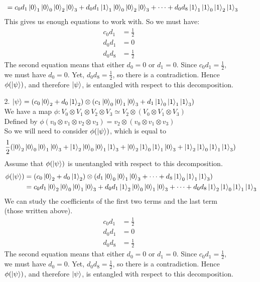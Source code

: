 \documentclass[11pt]{article}
\def\haf{\frac{1}{2}}
\begin{document}
\begin{itemize}
\begin{enumerate}
\begin{align*}
                &= c_0d_1\ket{0}_1\ket{0}_0\ket{0}_2\ket{0}_3 + d_0d_1\ket{1}_1\ket{0}_0\ket{0}_2\ket{0}_3 + \cdots + d_0d_8\ket{1}_1\ket{1}_0\ket{1}_2\ket{1}_3
            \end{align*}
            This gives us enough equations to work with. 
            So we must have: 
            \begin{align*}
                c_0d_1 &= \haf \\
                d_0d_1 &= 0 \\
                d_0d_8 &= \haf
            \end{align*}
            The second equation means that either $d_0 = 0$ or $d_1 = 0$. Since $c_0d_1 = \haf$, we must have $d_0 = 0$.
            Yet, $d_0d_8 = \haf$, so there is a contradiction. 
            Hence $\phi(\ket{\psi})$, and therefore $\ket{\psi}$, is entangled with respect to this decomposition.
            \newpage
        \item[2.]
        $\ket{\psi} = (c_0\ket{0}_2 + d_0\ket{1}_2) 
        \otimes (c_1\ket{0}_0\ket{0}_1\ket{0}_3 + d_1\ket{1}_0\ket{1}_1\ket{1}_3)$ \\
        We have a map $\phi : V_0 \otimes V_1 \otimes V_2 \otimes V_3 \simeq V_2 \otimes (V_0 \otimes V_1 \otimes V_3)$ \\
            Defined by $\phi(v_0 \otimes v_1 \otimes v_2 \otimes v_3) = v_2 \otimes (v_0 \otimes v_1 \otimes v_3) $ \\
            So we will need to consider $\phi(\ket{\psi})$, which is equal to 
            $$\haf(\ket{0}_2\ket{0}_0\ket{0}_1\ket{0}_3 + \ket{1}_2\ket{0}_0\ket{0}_1\ket{1}_3 + \ket{0}_2\ket{1}_0\ket{1}_1\ket{0}_3 + \ket{1}_2 \ket{1}_0\ket{1}_1\ket{1}_3)$$
            Assume that $\phi(\ket{\psi})$ is unentangled with respect to this decomposition.
            \begin{align*}
                \phi(\ket{\psi})
                &= (c_0\ket{0}_2 + d_0\ket{1}_2) \otimes (d_1\ket{0}_0\ket{0}_1\ket{0}_3 + \cdots + d_8\ket{1}_0\ket{1}_1\ket{1}_3) \\
                &= c_0d_1\ket{0}_2\ket{0}_0\ket{0}_1\ket{0}_3 + d_0d_1\ket{1}_2\ket{0}_0\ket{0}_1\ket{0}_3 + \cdots + d_0d_8\ket{1}_2\ket{1}_0\ket{1}_1\ket{1}_3
            \end{align*}
            We can study the coefficients of the first two terms and the last term (those written above).
            \begin{align*}
                c_0d_1 &= \haf \\
                d_0d_1 &= 0 \\
                d_0d_8 &= \haf
            \end{align*}
         The second equation means that either $d_0 = 0$ or $d_1 = 0$. Since $c_0d_1 = \haf$, we must have $d_0 = 0$.
            Yet, $d_0d_8 = \haf$, so there is a contradiction. 
            Hence $\phi(\ket{\psi})$, and therefore $\ket{\psi}$, is entangled with respect to this decomposition.


\end{enumerate}
\end{itemize}
\end{document}
